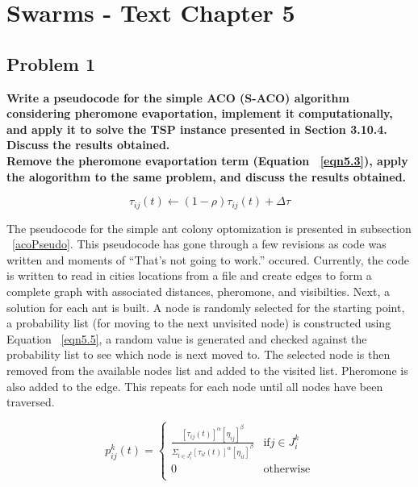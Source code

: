 
\chapter{Swarms - Text Chapter 5}

\section{ Problem 1 }
\textbf{Write a pseudocode for the simple ACO (S-ACO) algorithm considering pheromone evaportation, implement it computationally, and apply it to solve the TSP instance presented in Section 3.10.4. Discuss the results obtained.} \newline \\
\textbf{Remove the pheromone evaportation term (Equation ~\ref{eqn5.3}), apply the alogorithm to the same problem, and discuss the results obtained.}

\begin{equation} \label{eqn5.3}
\tau_{ij}(t) \leftarrow ( 1-\rho ) \tau_{ij}(t) + \Delta \tau
\end{equation}

The pseudocode for the simple ant colony optomization is presented in subsection ~\ref{acoPseudo}. This pseudocode has gone through a few revisions as code was written and moments of ``That's not going to work.'' occured. Currently, the code is written to read in cities locations from a file and create edges to form a complete graph with associated distances, pheromone, and visibilties. Next, a solution for each ant is built. A node is randomly selected for the starting point, a probability list (for moving to the next unvisited node) is constructed using Equation ~\ref{eqn5.5}, a random value is generated and checked against the probability list to see which node is next moved to. The selected node is then removed from the available nodes list and added to the visited list. Pheromone is also added to the edge. This repeats for each node until all nodes have been traversed.

\begin{equation} \label{eqn5.5}
p_{ij}^{k}(t) = 
	\begin{cases}
	\frac{ [\tau_{ij}(t)]^\alpha [\eta_{ij}]^\beta} {\Sigma_{l \in J_i^k}[\tau_{il}(t)]^\alpha[\eta_{il}]^\beta } & \text{if} j \in J_i^k \\
	0 	& \text{otherwise} \\
	\end{cases}
\end{equation}

